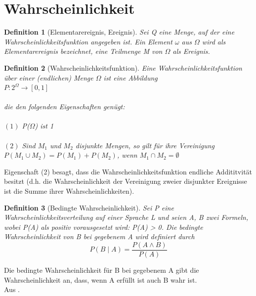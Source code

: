 \documentclass[a4paper, 11pt]{book}
\newtheorem{Def}{Definition }[section]
\begin{document}
{\section{Wahrscheinlichkeit} 


\begin{Def}[Elementarereignis, Ereignis] 
Sei Q eine Menge, auf der eine Wahrscheinlichkeitsfunktion angegeben ist. Ein Element $\omega$ aus $\Omega$ wird als Elementarereignis bezeichnet, eine Teilmenge M von $\Omega$ als Ereignis.\\
\end{Def}

\begin{Def}[Wahrscheinlichkeitsfunktion] 
Eine Wahrscheinlichkeitsfunktion über einer (endlichen) Menge $\Omega$ ist eine Abbildung\\

$P : 2^{\Omega} \rightarrow [0, 1] $\\
\\die den folgenden Eigenschaften genügt:\\
\\$ (1 )$ P($\Omega$) ist 1\\
\\$ (2) $ Sind $M_{1}$ und $M_{2}$ disjunkte Mengen, so gilt für ihre Vereinigung\\

$P(M_{1} \cup M_{2}) = P(M_{1}) + P(M_{2})$, wenn $M_{1} \cap M_{2} = \emptyset$
\end{Def}   
Eigenschaft (2) besagt, dass die Wahrscheinlichkeitsfunktion endliche Addititvität besitzt (d.h. die Wahrscheinlichkeit der Vereinigung zweier disjunkter Ereignisse ist die Summe ihrer Wahrscheinlichkeiten).\\

\begin{Def}[Bedingte Wahrscheinlichkeit] \label{sec: bed Wahr}
Sei P eine Wahrscheinlichkeitsverteilung auf einer Sprache L und seien A, B zwei Formeln, wobei P(A) als positiv vorausgesetzt wird: P(A) > 0. Die bedingte Wahrscheinlichkeit von B bei gegebenem A wird definiert durch\\
\[P( B\mid A ) = \frac{P(A\wedge B)}{P(A)}\]

\end{Def}
Die bedingte Wahrscheinlichkeit für B bei gegebenem A gibt die Wahrscheinlichkeit an, dass, wenn A erfüllt ist auch B wahr ist.\\
Aus \cite{BKI08}.
\newpage

}
\end{document}
